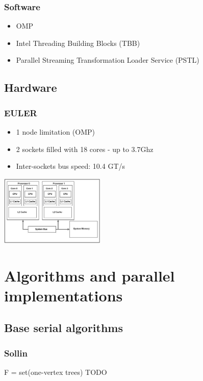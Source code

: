 \documentclass{beamer}
\begin{document}
\begin{frame}
\frametitle{Software}
\centering

\begin{itemize}
\item OMP
\item Intel Threading Building Blocks (TBB)
\item Parallel Streaming Transformation Loader Service (PSTL)
\end{itemize}

\end{frame}

\subsection{Hardware}

\begin{frame}
\frametitle{EULER}
\centering

\begin{itemize}
\item 1 node limitation (OMP)
\item 2 sockets filled with 18 cores - up to 3.7Ghz
\item Inter-sockets bus speed: 10.4 GT/s
\end{itemize}

\includegraphics[width=5cm]{dual_sockets_caches.png}
\end{frame}



\section{Algorithms and parallel implementations}

\subsection{Base serial algorithms}

\begin{frame}[fragile]
\frametitle{Sollin}
\small
\begin{algorithm}[H]
\begin{algorithmic}[1]

\STATE F = set(one-vertex trees)
\STATE TODO
\ENDWHILE

\end{algorithmic}
\end{algorithm}
\end{frame}
\end{document}
